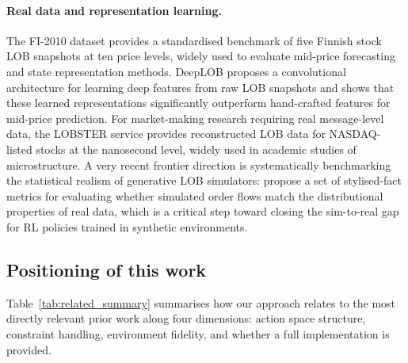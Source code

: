 \documentclass[11pt]{article}
\begin{document}
\paragraph{Real data and representation learning.}
The FI-2010 dataset \parencite{ntakaris2018fi2010} provides a standardised
benchmark of five Finnish stock LOB snapshots at ten price levels,
widely used to evaluate mid-price forecasting and state representation
methods.
DeepLOB \parencite{zhang2019deeplob} proposes a convolutional architecture
for learning deep features from raw LOB snapshots and shows that these
learned representations significantly outperform hand-crafted features
for mid-price prediction.
For market-making research requiring real message-level data, the LOBSTER
service \parencite{lobsterdata} provides reconstructed LOB data for
NASDAQ-listed stocks at the nanosecond level, widely used in academic
studies of microstructure.
A very recent frontier direction is systematically benchmarking the
statistical realism of generative LOB simulators: \textcite{lobbench2025}
propose a set of stylised-fact metrics for evaluating whether simulated
order flows match the distributional properties of real data, which is
a critical step toward closing the sim-to-real gap for RL policies
trained in synthetic environments.

\subsection{Positioning of this work}

Table~\ref{tab:related_summary} summarises how our approach relates to
the most directly relevant prior work along four dimensions:
action space structure, constraint handling, environment fidelity, and
whether a full implementation is provided.
\end{document}
